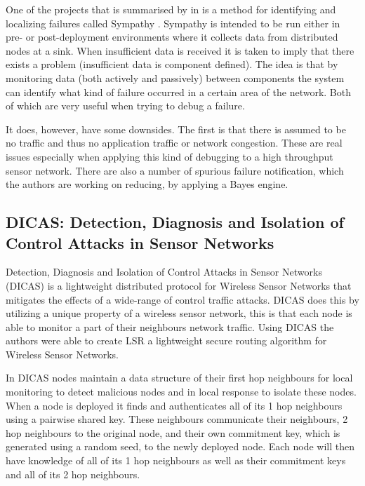 One of the projects that is summarised by \citeauthor{herbert2007adaptive} in \cite{herbert2007adaptive} is a method for identifying and localizing failures called Sympathy \cite{ramanathan2005sympathy}. Sympathy is intended to be run either in pre- or post-deployment environments where it collects data from distributed nodes at a sink. When insufficient data is received it is taken to imply that there exists a problem (insufficient data is component defined). The idea is that by monitoring data (both actively and passively) between components the system can identify what kind of failure occurred in a certain area of the network. Both of which are very useful when trying to debug a failure.

It does, however, have some downsides. The first is that there is assumed to be no traffic and thus no application traffic or network congestion. These are real issues especially when applying this kind of debugging to a high throughput sensor network. There are also a number of spurious failure notification, which the authors are working on reducing, by applying a Bayes engine.

\subsection {DICAS: Detection, Diagnosis and Isolation of Control Attacks in Sensor Networks}

Detection, Diagnosis and Isolation of Control Attacks in Sensor Networks (DICAS) \cite{dicaspaper} is a lightweight distributed protocol for Wireless Sensor Networks that mitigates the effects of a wide-range of control traffic attacks. DICAS does this by utilizing a unique property of a wireless sensor network, this is that each node is able to monitor a part of their neighbours network traffic. Using DICAS the authors were able to create LSR a lightweight secure routing algorithm for Wireless Sensor Networks.

In DICAS nodes maintain a data structure of their first hop neighbours for local monitoring to detect malicious nodes and in local response to isolate these nodes. When a node is deployed it finds and authenticates all of its 1 hop neighbours using a pairwise shared key. These neighbours communicate their neighbours, 2 hop neighbours to the original node, and their own commitment key, which is generated using a random seed, to the newly deployed node. Each node will then have knowledge of all of its 1 hop neighbours as well as their commitment keys and all of its 2 hop neighbours.

